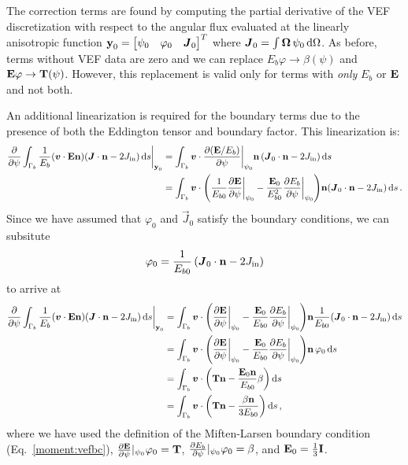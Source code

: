 \documentclass[../doc.tex]{subfiles}
\begin{document}
The correction terms are found by computing the partial derivative of the VEF discretization with respect to the angular flux evaluated at the linearly anisotropic function $\boldsymbol{\mathrm{y}}_0 = \begin{bmatrix} \psi_0 & \varphi_0 & \boldsymbol{J}_0 \end{bmatrix}^T$ where $\boldsymbol{J}_0 = \int \boldsymbol{\Omega}\,\psi_0 \mathop{}\!\mathrm{d} \Omega$. As before, terms without VEF data are zero and we can replace $E_b\varphi \rightarrow \beta(\psi)$ and $\boldsymbol{\mathrm{E}}\varphi \rightarrow \boldsymbol{\mathrm{T}}(\psi)$. However, this replacement is valid only for terms with \emph{only} $E_b$ or $\boldsymbol{\mathrm{E}}$ and not both. 

An additional linearization is required for the boundary terms due to the presence of both the Eddington tensor and boundary factor. This linearization is: 
	\begin{equation}
	\begin{aligned}
		\frac{\partial }{\partial \psi}\int_{\Gamma_b} \frac{1}{E_b}\!\left( \boldsymbol{v}\cdot\boldsymbol{\mathrm{E}}\boldsymbol{\mathrm{n}} \right)\!\left( \boldsymbol{J}\cdot\boldsymbol{\mathrm{n}} - 2J_\text{in} \right) \mathop{}\!\mathrm{d} s \biggr\rvert_{\boldsymbol{\mathrm{y}}_0} &= \int_{\Gamma_b} \boldsymbol{v}\cdot\frac{\partial (\boldsymbol{\mathrm{E}}/E_b)}{\partial \psi}\biggr\rvert_{\psi_0}\boldsymbol{\mathrm{n}}\left( \boldsymbol{J}_0\cdot\boldsymbol{\mathrm{n}} - 2J_\text{in} \right) \mathop{}\!\mathrm{d} s \\
		&= \int_{\Gamma_b} \boldsymbol{v} \cdot \left( \frac{1}{E_{b0}}\frac{\partial \boldsymbol{\mathrm{E}}}{\partial \psi}\biggr\rvert_{\psi_0} - \frac{\boldsymbol{\mathrm{E}}_0}{E_{b0}^2}\frac{\partial E_b}{\partial \psi}\biggr\rvert_{\psi_0} \right)\!\boldsymbol{\mathrm{n}}\!\left( \boldsymbol{J}_0\cdot\boldsymbol{\mathrm{n}} - 2J_\text{in} \right) \mathop{}\!\mathrm{d} s \,. 
	\end{aligned}
	\end{equation}
Since we have assumed that $\varphi_0$ and $\vec{J}_0$ satisfy the boundary conditions, we can subsitute 
	\begin{equation}
		\varphi_0 = \frac{1}{E_{b0}}\left( \boldsymbol{J}_0\cdot\boldsymbol{\mathrm{n}} - 2J_\text{in} \right) 
	\end{equation}
to arrive at 
	\begin{equation}
	\begin{aligned}
		\pderiv{}{\psi}\int_{\Gamma_b} \frac{1}{E_b}\!\paren{\vec{v}\cdot\E\n}\!\paren{\vec{J}\cdot\n - 2\Jin} \ud s \biggr\rvert_{\y_0} &= \int_{\Gamma_b} \vec{v}\cdot\paren{\pderiv{\E}{\psi}\biggr\rvert_{\psi_0} - \frac{\E_0}{E_{b0}} \pderiv{E_b}{\psi}\biggr\rvert_{\psi_0}}\!\n \frac{1}{E_{b0}}\!\paren{\vec{J}_0\cdot\n - 2\Jin} \ud s \\
		&= \int_{\Gamma_b} \vec{v}\cdot\paren{\pderiv{\E}{\psi}\biggr\rvert_{\psi_0} - \frac{\E_0}{E_{b0}} \pderiv{E_b}{\psi}\biggr\rvert_{\psi_0}}\!\n\,\varphi_0 \ud s \\
		&= \int_{\Gamma_b} \vec{v}\cdot\paren{\T\n - \frac{\E_0\n}{E_{b0}}\beta} \ud s \\
		&= \int_{\Gamma_b} \vec{v}\cdot\paren{\T\n - \frac{\beta\n}{3E_{b0}}} \ud s \,, 
	\end{aligned}
	\end{equation}
where we have used the definition of the Miften-Larsen boundary condition (Eq.~\ref{moment:vefbc}), $\frac{\partial \boldsymbol{\mathrm{E}}}{\partial \psi}\rvert_{\psi_0}\varphi_0 = \boldsymbol{\mathrm{T}}$, $\frac{\partial E_b}{\partial \psi}\rvert_{\psi_0}\varphi_0 = \beta$, and $\boldsymbol{\mathrm{E}}_0 = \frac{1}{3}\boldsymbol{\mathrm{I}}$. 
\end{document}
